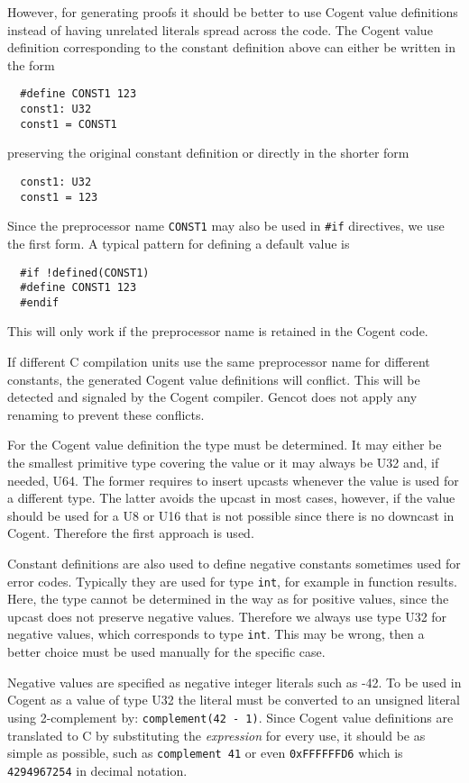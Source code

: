 \documentclass[a4paper]{report}
\newcommand{\code}[1]{\textnormal{\texttt{#1}}}
\begin{document}
However, for generating proofs it should be better to use Cogent value definitions instead of having unrelated 
literals spread across the code. The Cogent value definition corresponding to the constant definition above can either 
be written in the form
\begin{verbatim}
  #define CONST1 123
  const1: U32
  const1 = CONST1
\end{verbatim}
preserving the original constant definition or directly in the shorter form
\begin{verbatim}
  const1: U32
  const1 = 123
\end{verbatim}
Since the preprocessor name \code{CONST1} may also be used in \code{\#if} directives, we use the first form. A typical pattern 
for defining a default value is
\begin{verbatim}
  #if !defined(CONST1)
  #define CONST1 123
  #endif
\end{verbatim}
This will only work if the preprocessor name is retained in the Cogent code.

If different C compilation units use the same preprocessor name for different constants, the generated Cogent value definitions
will conflict. This will be detected and signaled by the Cogent compiler. Gencot does not apply any renaming to prevent these
conflicts.

For the Cogent value definition the type must be determined. It may either be the smallest primitive type covering the value 
or it may always be U32 and, if needed, U64. The former requires to insert upcasts whenever the value is used for a different 
type. The latter avoids the upcast in most cases, however, if the value should be used for a U8 or U16 that is not possible 
since there is no downcast in Cogent. Therefore the first approach is used.

Constant definitions are also used to define negative constants sometimes used for error codes. Typically they are used for 
type \code{int}, for example in function results. Here, the type cannot be determined in the way as for positive values, since the 
upcast does not preserve negative values. Therefore we always use type U32 for negative values, which corresponds to type 
\code{int}. This may be wrong, then a better choice must be used manually for the specific case.

Negative values are specified as negative integer literals such as -42. To be used in 
Cogent as a value of type U32 the literal must be converted to an unsigned literal using 2-complement by: 
\code{complement(42 - 1)}.
Since Cogent value definitions are translated to C by substituting the \textit{expression} for every use, it should be as 
simple as possible, such as \code{complement 41} or even \code{0xFFFFFFD6} which is \code{4294967254} in decimal notation.
\end{document}
